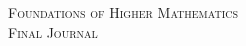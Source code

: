 \documentclass{article}
\begin{document}

\begin{center}
\textsc{\Large Foundations of Higher Mathematics}\\[.3cm]
\textsc{\Large Final Journal}\\[1cm]
\end{center}



 
\end{document}
